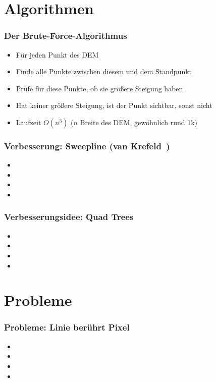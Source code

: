 \documentclass{beamer}
\begin{document}
\section{Algorithmen}

\begin{frame}
  \frametitle{Der Brute-Force-Algorithmus}
  \begin{itemize}[<+->]
    \item Für jeden Punkt des DEM
    \item Finde alle Punkte zwischen diesem und dem Standpunkt
    \item Prüfe für diese Punkte, ob sie größere Steigung haben
    \item Hat keiner größere Steigung, ist der Punkt sichtbar, sonst nicht
    \item Laufzeit $O(n^3)$ ($n$ Breite des DEM, gewöhnlich rund 1k)
  \end{itemize}
\end{frame}


\begin{frame}
  \frametitle{Verbesserung: Sweepline (van Krefeld~\cite{van1996variations})}
  \begin{itemize}[<+->]
    \item 
    \item 
    \item 
    \item 
  \end{itemize}
\end{frame}


\begin{frame}
  \frametitle{Verbesserungsidee: Quad Trees}
  \begin{itemize}[<+->]
    \item 
    \item 
    \item 
    \item 
  \end{itemize}
\end{frame}

\section{Probleme}

\begin{frame}
  \frametitle{Probleme: Linie berührt Pixel}
  \begin{itemize}[<+->]
    \item 
    \item 
    \item 
    \item 
  \end{itemize}
\end{frame}
\end{document}
